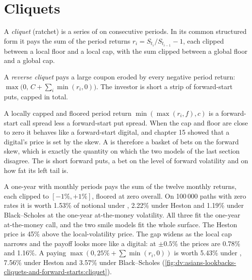 \section{Cliquets}

\begin{definition}[Cliquet]\label{def:dv:asians-lookbacks-cliquets-and-forward-starts:cliquet}
A \emph{cliquet} (ratchet) is a series of  on consecutive periods. In its common
structured form it pays the sum of the period returns $r_i=S_{t_i}/S_{t_{i-1}}-1$, each clipped between a local floor
and a local cap, with the sum clipped between a global floor and a global cap.
\end{definition}

\begin{definition}\label{def:dv:asians-lookbacks-cliquets-and-forward-starts:reverse}
A \emph{reverse cliquet} pays a large coupon eroded by every negative period return:
$\max\bigl(0,\,C+\sum_i\min(r_i,0)\bigr)$. The investor is short a strip of forward-start puts, capped in total.
\end{definition}

A locally capped and floored period return $\min(\max(r_i,f),c)$ is a forward-start call spread less a forward-start put
spread. When the cap and floor are close to zero it behaves like a forward-start digital, and chapter 15 showed that a
digital's price is set by the skew. A  is therefore a basket of bets on the forward skew, which is exactly the
quantity on which the two models of the last section disagree. The  is short forward puts, a bet on the
level of forward volatility and on how fat its left tail is.

\begin{example}\label{ex:dv:asians-lookbacks-cliquets-and-forward-starts:cliquet}
A one-year  with monthly periods pays the sum of the twelve monthly returns, each clipped to $[-1\%,+1\%]$, floored
at zero overall. On 100\,000 paths with zero rates it is worth 1.53\% of notional under , 2.22\% under
Heston and 1.19\% under Black--Scholes at the one-year at-the-money volatility. All three fit the one-year at-the-money
call, and the two smile models fit the whole surface. The Heston price is 45\% above the local-volatility price. The gap
widens as the local cap narrows and the payoff looks more like a digital: at $\pm0.5\%$ the prices are 0.78\% and 1.16\%. A
 paying $\max(0,25\%+\sum\min(r_i,0))$ is worth 5.43\% under , 7.56\% under Heston and 3.57\%
under Black--Scholes (\cref{fig:dv:asians-lookbacks-cliquets-and-forward-starts:cliquet}).
\end{example}

